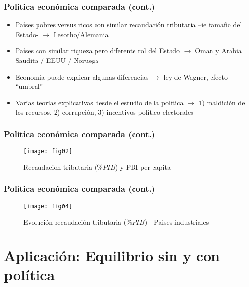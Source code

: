\documentclass[14pt,aspectratio=169]{beamer}
\begin{document}
\begin{frame}\frametitle{Politica económica comparada (cont.)}
  \begin{itemize}
    \item Países pobres versus ricos con similar recaudación tributaria --ie tamaño del
      Estado- $\longrightarrow$ Lesotho/Alemania
      \item Países con similar riqueza pero diferente rol del Estado
        $\longrightarrow$ Oman y Arabia Saudita / EEUU / Noruega
        \item Economia puede explicar algunas diferencias
          $\longrightarrow$ ley de Wagner, efecto ``umbral''
        \item Varias teorias explicativas desde el estudio de la
          política $\longrightarrow$ 1) maldición de los recursos, 2)
          corrupción, 3) incentivos político-electorales 
          \end{itemize}
\end{frame}



\begin{frame}\frametitle{Política económica comparada (cont.)}
  \begin{figure}[htbp]
    \centering
    \texttt{[image: fig02]}
    \caption{Recaudacion tributaria ($\%PIB$) y PBI per capita}
    \label{fig:1}
  \end{figure}
\end{frame}


  
\begin{frame}\frametitle{Política económica comparada (cont.)}
  \begin{figure}[htbp]
    \centering
    \texttt{[image: fig04]}
    \caption{Evolución recaudación tributaria ($\%PIB$) - Paises industriales}
    \label{fig:1}
  \end{figure}
\end{frame}


\section{Aplicación: Equilibrio sin y con política}
\end{document}
